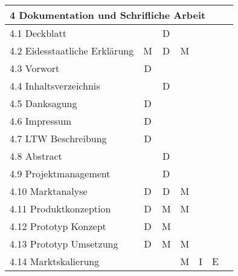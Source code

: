 \begin{longtable}{|l|c|c|c|c|c|c|}
  \multicolumn{7}{|l|}{4 Dokumentation und Schrifliche Arbeit}                                                                  \\ \hline
  4.1 Deckblatt                          &                & D           &            &          &               &               \\ \hline
  4.2 Eidesstaatliche Erklärung          & M              & D           & M          &          &               &               \\ \hline
  4.3 Vorwort                            & D              &             &            &          &               &               \\ \hline
  4.4 Inhaltsverzeichnis                 &                & D           &            &          &               &               \\ \hline
  4.5 Danksagung                         & D              &             &            &          &               &               \\ \hline
  4.6 Impressum                          & D              &             &            &          &               &               \\ \hline
  4.7 LTW Beschreibung                   & D              &             &            &          &               &               \\ \hline
  4.8 Abstract                           &                & D           &            &          &               &               \\ \hline
  4.9 Projektmanagement                  &                & D           &            &          &               &               \\ \hline
  4.10 Marktanalyse                      & D              & D           & M          &          &               &               \\ \hline
  4.11 Produktkonzeption                 & D              & M           & M          &          &               &               \\ \hline
  4.12 Prototyp Konzept                  & D              & M           &            &          &               &               \\ \hline
  4.13 Prototyp Umsetzung                & D              & M           & M          &          &               &               \\ \hline
  4.14 Marktskalierung                   &                &             & M          & I        & E             &               \\ \hline

\end{longtable}
